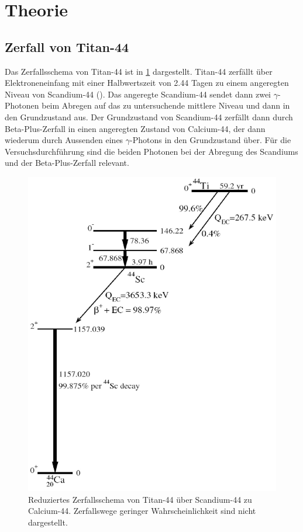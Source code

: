 \documentclass[
	a4paper,
	12pt,
	pagesize,
	ngerman
]{scrartcl}
\begin{document}
  \section{Theorie}
	\subsection{Zerfall von Titan-44}

	Das Zerfallsschema von Titan-44 ist in \cref{fig_Zerfallsschema} dargestellt. Titan-44 zerfällt über Elektroneneinfang mit einer Halbwertszeit von \SI{2,44}{} Tagen zu einem angeregten Niveau von Scandium-44 (\cite{Anleitung}). %
	Das angeregte Scandium-44 sendet dann zwei $\gamma$-Photonen beim Abregen auf das zu untersuchende mittlere Niveau und dann in den Grundzustand aus.
	Der Grundzustand von Scandium-44 zerfällt dann durch Beta-Plus-Zerfall in einen angeregten Zustand von Calcium-44, der dann wiederum durch Aussenden eines $\gamma$-Photons in den Grundzustand über.
	Für die Versuchsdurchführung sind die beiden Photonen bei der Abregung des Scandiums und der Beta-Plus-Zerfall relevant.
	\begin{figure}[H]
			\includegraphics[width=0.6\linewidth]{img/44Ti-decay_reduziert}
			\caption{
			Reduziertes Zerfallsschema von Titan-44 über Scandium-44 zu Calcium-44. Zerfallswege geringer Wahrscheinlichkeit sind nicht dargestellt.
			\cite{Zerfallsschema} %
			}
			\label{fig_Zerfallsschema}
	\end{figure}
\end{document}
